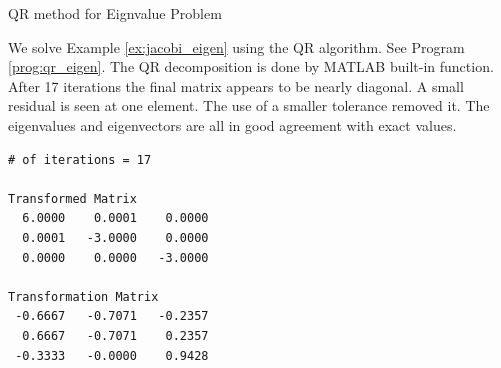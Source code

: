 {\begin{center}
\begin{Algorithm}{QR method for Eignvalue Problem}
\end{Algorithm}
\end{center}



\begin{example}
We solve Example \ref{ex:jacobi_eigen} using the QR algorithm. See Program \ref{prog:qr_eigen}.  The QR decomposition is done by MATLAB built-in function. After 17 iterations the final matrix appears to be nearly diagonal.  A small residual is seen at one element.  The use of a smaller tolerance removed it.  The eigenvalues and eigenvectors are all in good agreement with exact values.

\begin{center}
\begin{minipage}{3in}
\small
\begin{Verbatim}[frame=single]
# of iterations = 17

Transformed Matrix
  6.0000    0.0001    0.0000
  0.0001   -3.0000    0.0000
  0.0000    0.0000   -3.0000

Transformation Matrix
 -0.6667   -0.7071   -0.2357
  0.6667   -0.7071    0.2357
 -0.3333   -0.0000    0.9428
\end{Verbatim}
\normalsize
\end{minipage}
\end{center}
\end{example}

}
